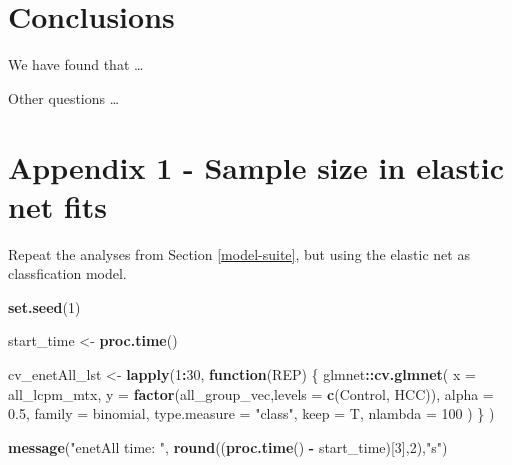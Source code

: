 \documentclass[
]{book}
\newenvironment{Shaded}{\begin{snugshade}}{\end{snugshade}}
\newcommand{\ControlFlowTok}[1]{\textcolor[rgb]{0.13,0.29,0.53}{\textbf{#1}}}
\newcommand{\DataTypeTok}[1]{\textcolor[rgb]{0.13,0.29,0.53}{#1}}
\newcommand{\DecValTok}[1]{\textcolor[rgb]{0.00,0.00,0.81}{#1}}
\newcommand{\FloatTok}[1]{\textcolor[rgb]{0.00,0.00,0.81}{#1}}
\newcommand{\KeywordTok}[1]{\textcolor[rgb]{0.13,0.29,0.53}{\textbf{#1}}}
\newcommand{\NormalTok}[1]{#1}
\newcommand{\OperatorTok}[1]{\textcolor[rgb]{0.81,0.36,0.00}{\textbf{#1}}}
\newcommand{\StringTok}[1]{\textcolor[rgb]{0.31,0.60,0.02}{#1}}
\begin{document}
\hypertarget{conclusions}{%
\chapter{Conclusions}\label{conclusions}}

We have found that \ldots{}

Other questions \ldots{}

\hypertarget{appendix-1}{%
\chapter*{Appendix 1 - Sample size in elastic net fits}\label{appendix-1}}

Repeat the analyses from Section \ref{model-suite}, but using
the elastic net as classfication model.

\begin{Shaded}
\begin{Highlighting}[]
\KeywordTok{set.seed}\NormalTok{(}\DecValTok{1}\NormalTok{)}

\NormalTok{start\_time <{-}}\StringTok{  }\KeywordTok{proc.time}\NormalTok{()}

\NormalTok{cv\_enetAll\_lst <{-}}\StringTok{ }\KeywordTok{lapply}\NormalTok{(}\DecValTok{1}\OperatorTok{:}\DecValTok{30}\NormalTok{, }\ControlFlowTok{function}\NormalTok{(REP) \{}
\NormalTok{glmnet}\OperatorTok{::}\KeywordTok{cv.glmnet}\NormalTok{(}
 \DataTypeTok{x =}\NormalTok{ all\_lcpm\_mtx,}
 \DataTypeTok{y =} \KeywordTok{factor}\NormalTok{(all\_group\_vec,}\DataTypeTok{levels =} \KeywordTok{c}\NormalTok{(}\StringTok{\textquotesingle{}Control\textquotesingle{}}\NormalTok{, }\StringTok{\textquotesingle{}HCC\textquotesingle{}}\NormalTok{)),}
 \DataTypeTok{alpha =} \FloatTok{0.5}\NormalTok{,}
 \DataTypeTok{family =} \StringTok{\textquotesingle{}binomial\textquotesingle{}}\NormalTok{,}
 \DataTypeTok{type.measure  =}  \StringTok{"class"}\NormalTok{,}
 \DataTypeTok{keep =}\NormalTok{ T,}
 \DataTypeTok{nlambda =} \DecValTok{100}
\NormalTok{)}
\NormalTok{\}}
\NormalTok{)}

\KeywordTok{message}\NormalTok{(}\StringTok{"enetAll time: "}\NormalTok{, }\KeywordTok{round}\NormalTok{((}\KeywordTok{proc.time}\NormalTok{() }\OperatorTok{{-}}\StringTok{ }\NormalTok{start\_time)[}\DecValTok{3}\NormalTok{],}\DecValTok{2}\NormalTok{),}\StringTok{"s"}\NormalTok{)}
\end{Highlighting}
\end{Shaded}
\end{document}
